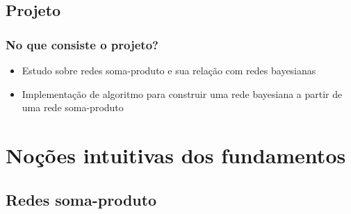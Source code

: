 \documentclass[dvipsnames]{beamer}
\begin{document}
  \subsection{Projeto}

  \begin{frame}
    \frametitle{No que consiste o projeto?}

    \begin{itemize}
      \item Estudo sobre redes soma-produto e sua relação com redes bayesianas
      \item Implementação de algoritmo para construir uma rede bayesiana a partir de uma rede soma-produto
    \end{itemize}
  \end{frame}

  \section{Noções intuitivas dos fundamentos}

  \subsection{Redes soma-produto}
\end{document}
